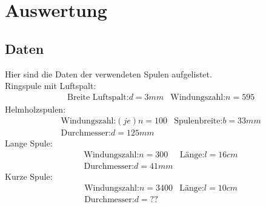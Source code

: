 \section{Auswertung}
\subsection{Daten}
Hier sind die Daten der verwendeten Spulen
aufgelistet.\\
\noindent Ringspule mit Luftspalt:\\
\begin{align*}
  &\text{Breite Luftspalt:} d=3mm &\text{Windungszahl:} n=595
\end{align*}
\noindent Helmholzspulen:\\
\begin{align*}
  &\text{Windungszahl:}(je) n=100 &\text{Spulenbreite:} b=33mm\\
  &\text{Durchmesser:} d=125mm
\end{align*}
Lange Spule:\\
\begin{align*}
  &\text{Windungszahl:} n=300 &\text{Länge:} l=16cm\\
  &\text{Durchmesser:} d=41mm
\end{align*}
Kurze Spule:\\
\begin{align*}
  &\text{Windungszahl:} n=3400 &\text{Länge:} l=10cm\\
  &\text{Durchmesser:} d=??
\end{align*}
